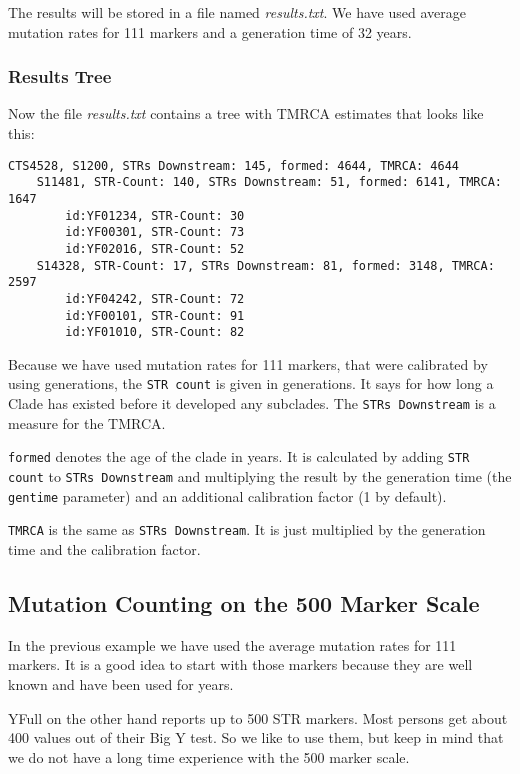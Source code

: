 The results will be stored in a file named \emph{results.txt}.
We have used average mutation rates for 111 markers and a
generation time of 32 years.


\subsubsection*{Results Tree}

Now the file \emph{results.txt} contains a tree with TMRCA
estimates that looks like this:

\begin{verbatim}
CTS4528, S1200, STRs Downstream: 145, formed: 4644, TMRCA: 4644
    S11481, STR-Count: 140, STRs Downstream: 51, formed: 6141, TMRCA: 1647
        id:YF01234, STR-Count: 30
        id:YF00301, STR-Count: 73
        id:YF02016, STR-Count: 52
    S14328, STR-Count: 17, STRs Downstream: 81, formed: 3148, TMRCA: 2597
        id:YF04242, STR-Count: 72
        id:YF00101, STR-Count: 91
        id:YF01010, STR-Count: 82
\end{verbatim}

Because we have used mutation rates for 111 markers, that
were calibrated by using generations, the \texttt{STR count}
is given in generations. It says for how long a Clade has
existed before it developed any subclades. The
\texttt{STRs Downstream} is a measure for the TMRCA.

\texttt{formed} denotes the age of the clade in years. It is
calculated by adding \texttt{STR count} to \texttt{STRs Downstream}
and multiplying the result by the generation time (the
\texttt{gentime} parameter) and an additional calibration
factor (1 by default).

\texttt{TMRCA} is the same as \texttt{STRs Downstream}. It is
just multiplied by the generation time and the calibration
factor.


\subsection{Mutation Counting on the 500 Marker Scale}

In the previous example we have used the average mutation rates
for 111 markers. It is a good idea to start with those markers
because they are well known and have been used for years.

YFull on the other hand reports up to 500 STR markers. Most persons
get about 400 values out of their Big Y test. So we like to use
them, but keep in mind that we do not have a long time experience
with the 500 marker scale.

